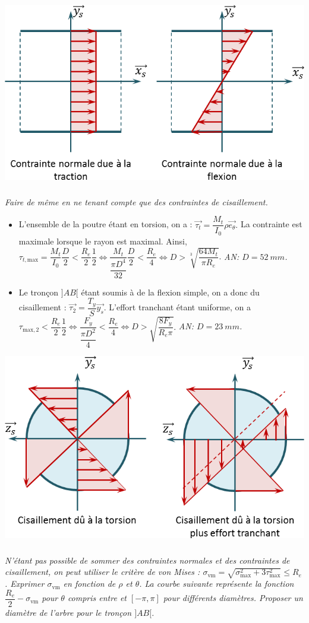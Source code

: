 \documentclass[10pt,fleqn]{article} %
\begin{document}
\begin{multicols}{2}
\begin{center}
\includegraphics[width=.5\linewidth]{images/corr_03}
\end{center} 

\subparagraph{}\textit{Faire de même en ne tenant compte que des contraintes de cisaillement.}



\begin{itemize}
\item L'ensemble de la poutre étant en torsion, on a : $ \overrightarrow{\tau_t}=\dfrac{M_t}{I_{0}}\rho \overrightarrow{e_{\theta}}.$ La contrainte est maximale lorsque le rayon est maximal. Ainsi, $ \tau_{t,\text{max}} = \dfrac{M_t}{I_{0}}\dfrac{D}{2} <\dfrac{R_e}{2}\dfrac{1}{2} \Leftrightarrow \dfrac{M_t}{\dfrac{\pi D^4}{32}}\dfrac{D}{2} <\dfrac{R_e}{4} \Leftrightarrow D > \sqrt[3]{\dfrac{64 M_t}{\pi R_e}} $. 
\textit{AN: $D= \SI{52}{mm}$.}
\item Le tronçon $]AB[$ étant soumis à de la flexion simple, on a donc du cisaillement : $\overrightarrow{\tau_{2}} = \dfrac{T_y}{S}\overrightarrow{y_s}$. 
L'effort tranchant étant uniforme, on a $\tau_{\text{max},2} < \dfrac{R_e}{2}\dfrac{1}{2} \Leftrightarrow  \dfrac{F_y}{\dfrac{\pi D^2}{4}}< \dfrac{R_e}{4} \Leftrightarrow D > \sqrt{\dfrac{8 F_y}{R_e \pi }}$. \textit{AN: $D= \SI{23}{mm}$.}
\end{itemize}
\ifprof
\else
\end{multicols}
\fi


\begin{center}
\includegraphics[width=.5\linewidth]{images/corr_04}
\end{center}

\subparagraph{}\textit{N'étant pas possible de sommer des contraintes normales et des contraintes de cisaillement, on peut utiliser le critère de von Mises : $\sigma_{\text{vm}}=\sqrt{\sigma_{\text{max}}^2+3\tau_{\text{max}}^2}\leq R_e$. Exprimer $\sigma_{\text{vm}}$ en fonction de $\rho$ et $\theta$. La courbe suivante représente la fonction $\dfrac{R_e}{2}-\sigma_{\text{vm}}$ pour $\theta$ compris entre et $\left[-\pi,\pi\right]$ pour différents diamètres. Proposer un diamètre de l'arbre pour le tronçon $]AB[$.}
\end{document}

